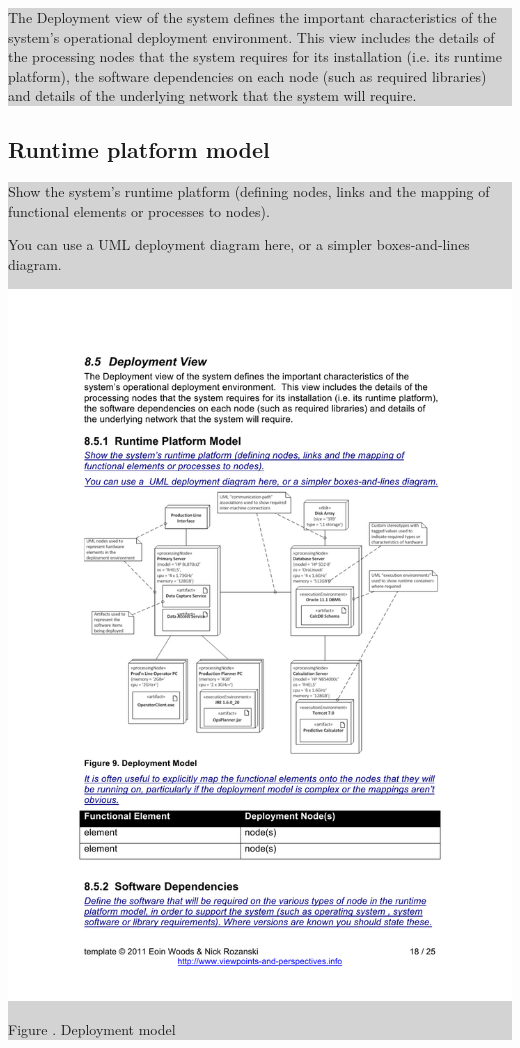 \documentclass[a4paper,11pt]{report}
\newcommand{\instructions}[1]{
  \noindent\colorbox{lightgray}{%
    \parbox{\linewidth}{%
      #1
    }%
  }%
 \vspace{0.1cm}
}
\newcommand{\mycaption}[1]{
  \addtocounter{figures}{1}
  Figure \arabic{figures}. #1
}
\begin{document}
\instructions{
The Deployment view of the system defines the important
characteristics of the system’s operational deployment
environment. This view includes the details of the processing nodes
that the system requires for its installation (i.e. its runtime
platform), the software dependencies on each node (such as required
libraries) and details of the underlying network that the system will
require.
}

\subsection{Runtime platform model}
\label{sec:runt-platf-model}

\instructions{
Show the system’s runtime platform (defining nodes, links and the
mapping of functional elements or processes to nodes).

You can use a UML deployment diagram here, or a simpler
boxes-and-lines diagram.

\begin{center}
  \includegraphics[width=\textwidth]{figures/deploymentmodel}\\
  \mycaption{Deployment model}
\end{center}

}
\end{document}
